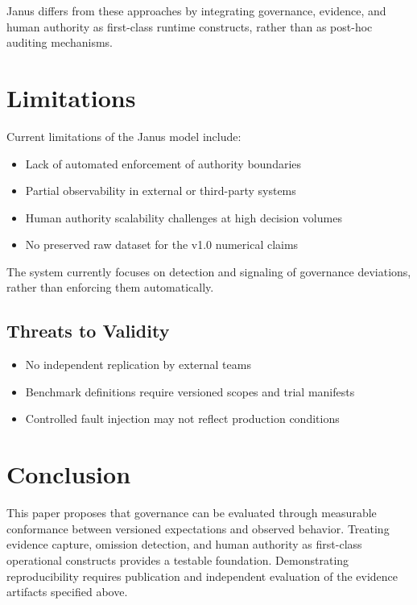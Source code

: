 \documentclass[conference]{IEEEtran}
\begin{document}
Janus differs from these approaches by integrating governance, evidence, and
human authority as first-class runtime constructs, rather than as post-hoc
auditing mechanisms.

\section{Limitations}

Current limitations of the Janus model include:

\begin{itemize}
    \item Lack of automated enforcement of authority boundaries
    \item Partial observability in external or third-party systems
    \item Human authority scalability challenges at high decision volumes
    \item No preserved raw dataset for the v1.0 numerical claims
\end{itemize}

The system currently focuses on detection and signaling of governance deviations,
rather than enforcing them automatically.

\subsection{Threats to Validity}
\begin{itemize}
    \item No independent replication by external teams
    \item Benchmark definitions require versioned scopes and trial manifests
    \item Controlled fault injection may not reflect production conditions
\end{itemize}

\section{Conclusion}

This paper proposes that governance can be evaluated through measurable
conformance between versioned expectations and observed behavior. Treating
evidence capture, omission detection, and human authority as first-class
operational constructs provides a testable foundation. Demonstrating
reproducibility requires publication and independent evaluation of the evidence
artifacts specified above.
\end{document}
